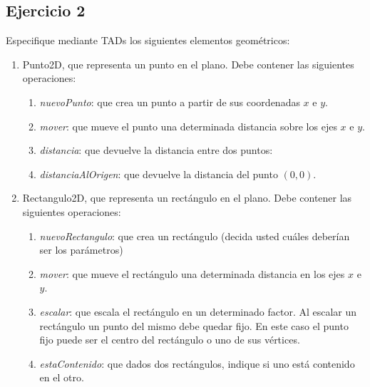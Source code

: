 \subsection{Ejercicio 2}
Especifique mediante TADs los siguientes elementos geométricos:

\begin{enumerate}
	\item Punto2D, que representa un punto en el plano. Debe contener las siguientes operaciones:

	      \begin{enumerate}[label=\alph*)]
		      \item \textit{nuevoPunto}: que crea un punto a partir de sus coordenadas $x$ e $y$.
		      \item \textit{mover}: que mueve el punto una determinada distancia sobre los ejes $x$ e $y$.
		      \item \textit{distancia}: que devuelve la distancia entre dos puntos:
		      \item \textit{distanciaAlOrigen}: que devuelve la distancia del punto $(0,0)$.
	      \end{enumerate}

	\item Rectangulo2D, que representa un rectángulo en el plano. Debe contener las siguientes operaciones:

	      \begin{enumerate}[label=\alph*)]
		      \item \textit{nuevoRectangulo}: que crea un rectángulo (decida usted cuáles deberían ser los parámetros)
		      \item \textit{mover}: que mueve el rectángulo una determinada distancia en los ejes $x$ e $y$.
		      \item \textit{escalar}: que escala el rectángulo en un determinado factor. Al escalar un rectángulo un punto del mismo debe quedar fijo. En este caso el punto fijo puede ser el centro del rectángulo o uno de sus vértices.
		      \item \textit{estaContenido}: que dados dos rectángulos, indique si uno está contenido en el otro.
	      \end{enumerate}
\end{enumerate}

